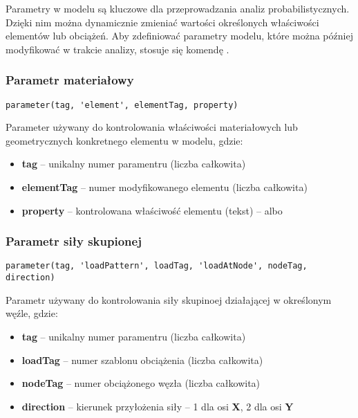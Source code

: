 Parametry w modelu są kluczowe dla przeprowadzania analiz probabilistycznych. Dzięki nim można dynamicznie zmieniać wartości określonych właściwości elementów lub obciążeń.
Aby zdefiniować parametry modelu, które można później modyfikować w trakcie analizy, stosuje się komendę .

\subsubsection*{Parametr materiałowy}

\begin{lstlisting}
parameter(tag, 'element', elementTag, property)
\end{lstlisting}
Parameter używany do kontrolowania właściwości materiałowych lub geometrycznych konkretnego elementu w modelu, gdzie:

\begin{itemize}
    \item \textbf{tag} – unikalny numer paramentru (liczba całkowita)
    \item \textbf{elementTag} – numer modyfikowanego elementu (liczba całkowita)
    \item \textbf{property} – kontrolowana właściwość elementu (tekst) –  albo 
\end{itemize}

\subsubsection*{Parametr siły skupionej}

\begin{lstlisting}
parameter(tag, 'loadPattern', loadTag, 'loadAtNode', nodeTag, direction)
\end{lstlisting}
Parametr używany do kontrolowania siły skupinoej działającej w określonym węźle, gdzie:

\begin{itemize}
    \item \textbf{tag} – unikalny numer paramentru (liczba całkowita)
    \item \textbf{loadTag} – numer szablonu obciążenia (liczba całkowita)
    \item \textbf{nodeTag} – numer obciążonego węzła (liczba całkowita)
    \item \textbf{direction} – kierunek przyłożenia siły – 1 dla osi \textbf{X}, 2 dla osi \textbf{Y}
\end{itemize}

